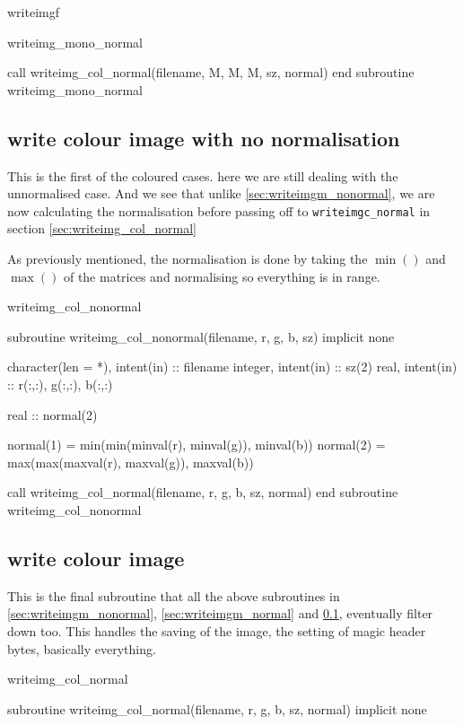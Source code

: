 \documentclass[a4paper]{article}
\begin{document}
\begin{codeblock}{writeimgf}
\begin{codeblock}[noindex]{writeimg_mono_normal}
\begin{code}
		call  writeimg_col_normal(filename, M, M, M, sz, normal)
	end subroutine writeimg_mono_normal
\end{code}
\end{codeblock}

\subsection{write colour image with no normalisation}
\label{sec:writeimg_col_nonormal}

This is the first of the coloured cases. here we are still dealing with the unnormalised case. And we see that unlike \autoref{sec:writeimgm_nonormal}, we are now calculating the normalisation before passing off to \texttt{writeimgc\_normal} in section \autoref{sec:writeimg_col_normal}

As previously mentioned, the normalisation is done by taking the $\min()$ and $\max()$ of the matrices and normalising so everything is in range.


\begin{codeblock}{writeimg_col_nonormal}
\begin{code}
	subroutine writeimg_col_nonormal(filename, r, g, b, sz)
		implicit none
		
		character(len = *), intent(in) :: filename
		integer, intent(in) :: sz(2)
		real, intent(in) :: r(:,:), g(:,:), b(:,:)
		
		real :: normal(2)
		
		normal(1) = min(min(minval(r), minval(g)), minval(b))
		normal(2) = max(max(maxval(r), maxval(g)), maxval(b))
		
		call  writeimg_col_normal(filename, r, g, b, sz, normal)
	end subroutine writeimg_col_nonormal
\end{code}
\end{codeblock}

\subsection{write colour image}
\label{sec:writeimg_col_normal}

This is the final subroutine that all the above subroutines in \autoref{sec:writeimgm_nonormal}, \ref{sec:writeimgm_normal} and \ref{sec:writeimg_col_nonormal}, eventually filter down too. This handles the saving of the image, the setting of magic header bytes, basically everything.

\begin{codeblock}{writeimg_col_normal}
\begin{code}
	subroutine writeimg_col_normal(filename, r, g, b, sz, normal)
		implicit none


\end{code}
\end{codeblock}
\end{codeblock}
\end{document}

